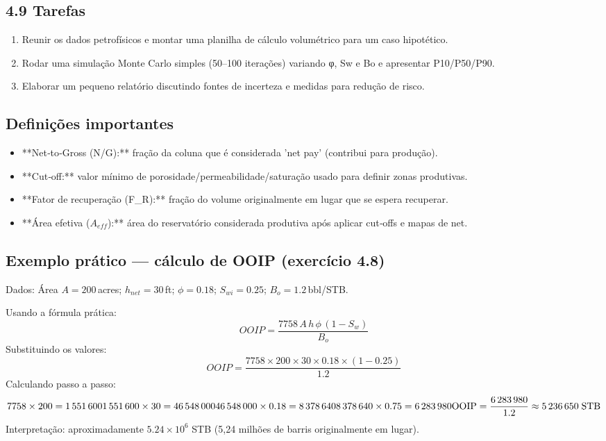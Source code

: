 \documentclass[11pt,a4paper]{article}
\begin{document}
\subsection{4.9 Tarefas}
\begin{enumerate}
\item Reunir os dados petrofísicos e montar uma planilha de cálculo volumétrico para um caso hipotético.
\item Rodar uma simulação Monte Carlo simples (50–100 iterações) variando φ, Sw e Bo e apresentar P10/P50/P90.
\item Elaborar um pequeno relatório discutindo fontes de incerteza e medidas para redução de risco.
\end{enumerate}

\subsection{Definições importantes}
\begin{itemize}
\item **Net‑to‑Gross (N/G):** fração da coluna que é considerada 'net pay' (contribui para produção).
\item **Cut‑off:** valor mínimo de porosidade/permeabilidade/saturação usado para definir zonas produtivas.
\item **Fator de recuperação (F_R):** fração do volume originalmente em lugar que se espera recuperar.
\item **Área efetiva ($A_{eff}$):** área do reservatório considerada produtiva após aplicar cut‑offs e mapas de net.
\end{itemize}

\subsection{Exemplo prático — cálculo de OOIP (exercício 4.8)}
Dados: Área $A=200\,$acres; $h_{net}=30\,$ft; $\phi=0.18$; $S_{wi}=0.25$; $B_o=1.2\,$bbl/STB.

Usando a fórmula prática:
$$
OOIP = \frac{7758\,A\,h\,\phi\,(1-S_w)}{B_o}
$$
Substituindo os valores:
$$
OOIP = \frac{7758 \times 200 \times 30 \times 0.18 \times (1-0.25)}{1.2}
$$
Calculando passo a passo:
$$
7758\times200 = 1\,551\,600\\
1\,551\,600\times30 = 46\,548\,000\\
46\,548\,000\times0.18 = 8\,378\,640\\
8\,378\,640\times0.75 = 6\,283\,980\\
	\text{OOIP} = \dfrac{6\,283\,980}{1.2} \approx 5\,236\,650\;\text{STB}
$$
Interpretação: aproximadamente $5.24\times10^6$ STB (5,24 milhões de barris originalmente em lugar).
\end{document}

